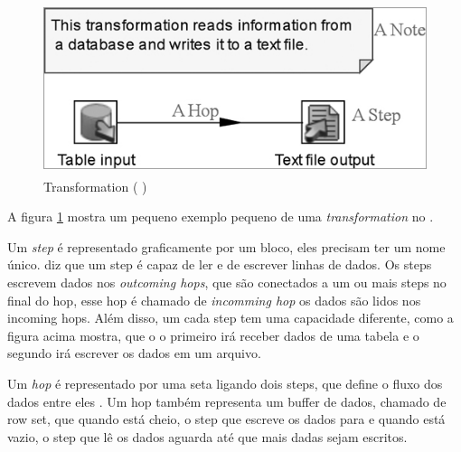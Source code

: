 \begin{figure}[H]
\centering
\includegraphics[height=5cm]{imagens/transformation.png}
\caption{Transformation (\citeauthor{kettle} \citeyear{kettle})}
\label{transformation}
\end{figure}

A figura \ref{transformation} mostra um pequeno exemplo pequeno de uma \textit{transformation} no \pdi.

Um \textit{step} é representado graficamente por um bloco, eles precisam ter um nome único.  diz que um step é capaz de ler e de escrever linhas de dados. Os steps escrevem dados nos \textit{outcoming hops}, que são conectados a um ou mais steps no final do hop, esse hop é chamado de \textit{incomming hop} os dados são lidos nos incoming hops. Além disso, um cada step tem uma capacidade diferente, como a figura acima mostra, que o o primeiro irá receber dados de uma tabela e o segundo irá escrever os dados em um arquivo.

Um \textit{hop} é representado por uma seta ligando dois steps, que define o fluxo dos dados entre eles \citep{kettle}. Um hop também representa um buffer de dados, chamado de row set, que quando está cheio, o step que escreve os dados para e quando está vazio, o step que lê os dados aguarda até que mais dadas sejam escritos.

